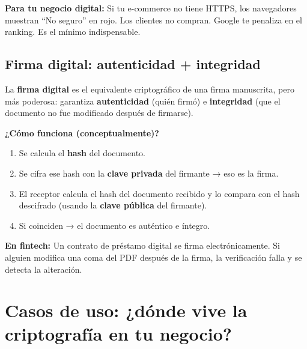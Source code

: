 \documentclass[12pt,a4paper]{article}
\begin{document}
\begin{cajaNota}
\textbf{Para tu negocio digital:} Si tu e-commerce no tiene HTTPS, los navegadores muestran ``No seguro'' en rojo. Los clientes no compran. Google te penaliza en el ranking. Es el m\'inimo indispensable.
\end{cajaNota}

\subsection{Firma digital: autenticidad + integridad}

\begin{cajaDefinicion}
La \textbf{firma digital} es el equivalente criptogr\'afico de una firma manuscrita, pero m\'as poderosa: garantiza \textbf{autenticidad} (qui\'en firm\'o) e \textbf{integridad} (que el documento no fue modificado despu\'es de firmarse).
\end{cajaDefinicion}

\textbf{¿C\'omo funciona (conceptualmente)?}
\begin{enumerate}[leftmargin=2em]
  \item Se calcula el \textbf{hash} del documento.
  \item Se cifra ese hash con la \textbf{clave privada} del firmante → eso es la firma.
  \item El receptor calcula el hash del documento recibido y lo compara con el hash descifrado (usando la \textbf{clave p\'ublica} del firmante).
  \item Si coinciden → el documento es aut\'entico e \'integro.
\end{enumerate}

\begin{cajaEjemplo}
\textbf{En fintech:} Un contrato de pr\'estamo digital se firma electr\'onicamente. Si alguien modifica una coma del PDF despu\'es de la firma, la verificaci\'on falla y se detecta la alteraci\'on.
\end{cajaEjemplo}

\newpage
\section{Casos de uso: ¿d\'onde vive la criptograf\'ia en tu negocio?}
\end{document}
